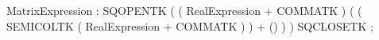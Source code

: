 %
%
%
\begin{rail}
MatrixExpression : SQOPENTK
                   ( ( RealExpression + COMMATK )
                     ( ( SEMICOLTK ( RealExpression + COMMATK ) ) + () ) )
                   SQCLOSETK
                 ;
\end{rail}
